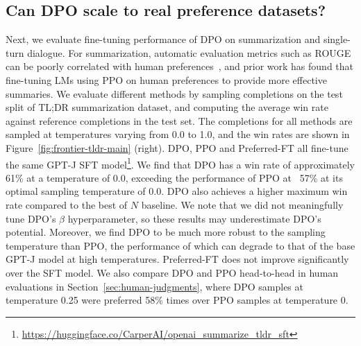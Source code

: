 \subsection{Can DPO scale to real preference datasets?}
\label{sec:dpo-real-datasets}
Next, we evaluate fine-tuning performance of DPO on summarization and single-turn dialogue. For summarization, 
automatic evaluation metrics such as ROUGE can be poorly correlated with human preferences~\citep{stiennon2022learning}, and prior work has found that fine-tuning LMs using PPO on human preferences to provide more effective summaries. We evaluate different methods by sampling completions on the test split of TL;DR summarization dataset, and computing the average win rate against reference completions in the test set. The completions for all methods are sampled at temperatures varying from 0.0 to 1.0, and the win rates are shown in Figure~\ref{fig:frontier-tldr-main} (right). DPO, PPO and Preferred-FT all fine-tune the same GPT-J SFT model\footnote{\url{https://huggingface.co/CarperAI/openai_summarize_tldr_sft}}. We find that DPO has a win rate of approximately 61\% at a temperature of 0.0, exceeding the performance of PPO at ~57\% at its optimal sampling temperature of 0.0. DPO also achieves a higher maximum win rate compared to the best of $N$ baseline. We note that we did not meaningfully tune DPO's $\beta$ hyperparameter, so these results may underestimate DPO's potential. Moreover, we find DPO to be much more robust to the sampling temperature than PPO, the performance of which can degrade to that of the base GPT-J model at high temperatures. Preferred-FT does not improve significantly over the SFT model. We also compare DPO and PPO head-to-head in human evaluations in Section~\ref{sec:human-judgments}, where DPO samples at temperature 0.25 were preferred 58\% times over PPO samples at temperature 0.

